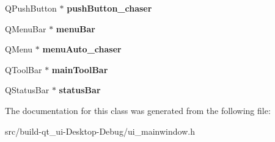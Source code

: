 \begin{DoxyCompactItemize}
\item 
Q\+Push\+Button $\ast$ {\bfseries push\+Button\+\_\+chaser}\hypertarget{class_ui___main_window_a9e8499b7c9a9717499abde993da72ed5}{}\label{class_ui___main_window_a9e8499b7c9a9717499abde993da72ed5}

\item 
Q\+Menu\+Bar $\ast$ {\bfseries menu\+Bar}\hypertarget{class_ui___main_window_a2be1c24ec9adfca18e1dcc951931457f}{}\label{class_ui___main_window_a2be1c24ec9adfca18e1dcc951931457f}

\item 
Q\+Menu $\ast$ {\bfseries menu\+Auto\+\_\+chaser}\hypertarget{class_ui___main_window_a8946bc17fa5b33e1c89ef82fdacab1d8}{}\label{class_ui___main_window_a8946bc17fa5b33e1c89ef82fdacab1d8}

\item 
Q\+Tool\+Bar $\ast$ {\bfseries main\+Tool\+Bar}\hypertarget{class_ui___main_window_a5172877001c8c7b4e0f6de50421867d1}{}\label{class_ui___main_window_a5172877001c8c7b4e0f6de50421867d1}

\item 
Q\+Status\+Bar $\ast$ {\bfseries status\+Bar}\hypertarget{class_ui___main_window_a50fa481337604bcc8bf68de18ab16ecd}{}\label{class_ui___main_window_a50fa481337604bcc8bf68de18ab16ecd}

\end{DoxyCompactItemize}


The documentation for this class was generated from the following file\+:\begin{DoxyCompactItemize}
\item 
src/build-\/qt\+\_\+ui-\/\+Desktop-\/\+Debug/ui\+\_\+mainwindow.\+h\end{DoxyCompactItemize}
